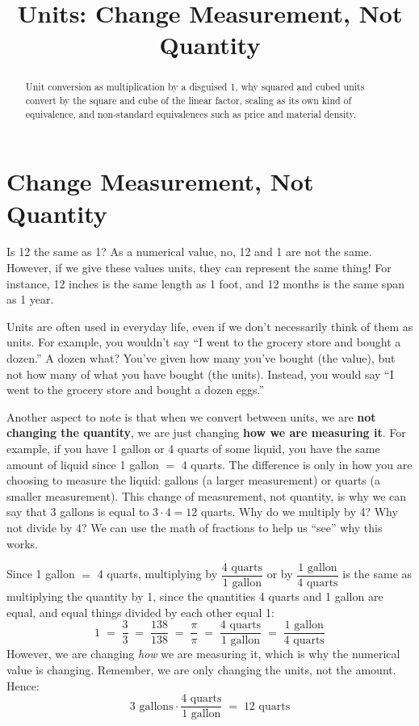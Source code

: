\documentclass[12pt]{ximera}
\title{Units: Change Measurement, Not Quantity}
\begin{document}
\begin{abstract}
Unit conversion as multiplication by a disguised 1, why squared and cubed units
convert by the square and cube of the linear factor, scaling as its own kind of
equivalence, and non-standard equivalences such as price and material density.
\end{abstract}
\maketitle

\section*{Change Measurement, Not Quantity}

Is 12 the same as 1? As a numerical value, no, 12 and 1 are not the same. However, if
we give these values units, they can represent the same thing! For instance, 12 inches
is the same length as 1 foot, and 12 months is the same span as 1 year.

Units are often used in everyday life, even if we don't necessarily think of them as
units. For example, you wouldn't say ``I went to the grocery store and bought a
dozen.'' A dozen what? You've given how many you've bought (the value), but not how
many of what you have bought (the units). Instead, you would say ``I went to the
grocery store and bought a dozen eggs.''

Another aspect to note is that when we convert between units, we are \textbf{not
changing the quantity}, we are just changing \textbf{how we are measuring it}. For
example, if you have 1 gallon or 4 quarts of some liquid, you have the same amount of
liquid since 1 gallon $=$ 4 quarts. The difference is only in how you are choosing to
measure the liquid: gallons (a larger measurement) or quarts (a smaller measurement).
This change of measurement, not quantity, is why we can say that 3 gallons is equal to
$3 \cdot 4 = 12$ quarts. Why do we multiply by 4? Why not divide by 4? We can use the
math of fractions to help us ``see'' why this works.

Since 1 gallon $=$ 4 quarts, multiplying by $\dfrac{4\text{ quarts}}{1\text{ gallon}}$
or by $\dfrac{1\text{ gallon}}{4\text{ quarts}}$ is the same as multiplying the
quantity by 1, since the quantities 4 quarts and 1 gallon are equal, and equal things
divided by each other equal 1:
\[
1 \;=\; \frac{3}{3} \;=\; \frac{138}{138} \;=\; \frac{\pi}{\pi}
\;=\; \frac{4\text{ quarts}}{1\text{ gallon}} \;=\; \frac{1\text{ gallon}}{4\text{ quarts}}
\]
However, we are changing \emph{how} we are measuring it, which is why the numerical
value is changing. Remember, we are only changing the units, not the amount. Hence:
\[
3\text{ gallons} \cdot \frac{4\text{ quarts}}{1\text{ gallon}} \;=\; 12\text{ quarts}
\]
\end{document}
